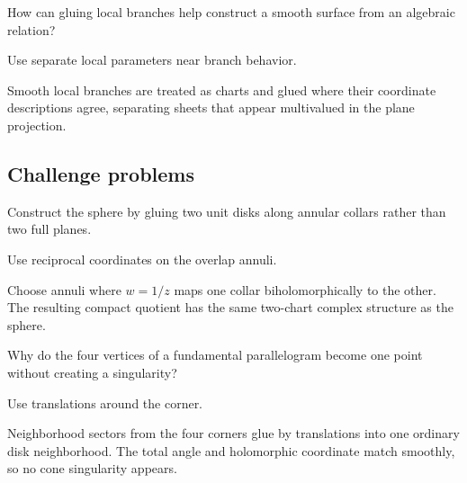 \begin{exercise}\label{exr:iv25-expand-14}
How can gluing local branches help construct a smooth surface from an algebraic relation?
\end{exercise}
\begin{hint}
Use separate local parameters near branch behavior.
\end{hint}
\begin{solution}
Smooth local branches are treated as charts and glued where their coordinate descriptions agree, separating sheets that appear multivalued in the plane projection.
\end{solution}

\subsection*{Challenge problems}

\begin{exercise}\label{exr:iv25-expand-15}
Construct the sphere by gluing two unit disks along annular collars rather than two full planes.
\end{exercise}
\begin{hint}
Use reciprocal coordinates on the overlap annuli.
\end{hint}
\begin{solution}
Choose annuli where \(w=1/z\) maps one collar biholomorphically to the other. The resulting compact quotient has the same two-chart complex structure as the sphere.
\end{solution}

\begin{exercise}\label{exr:iv25-expand-16}
Why do the four vertices of a fundamental parallelogram become one point without creating a singularity?
\end{exercise}
\begin{hint}
Use translations around the corner.
\end{hint}
\begin{solution}
Neighborhood sectors from the four corners glue by translations into one ordinary disk neighborhood. The total angle and holomorphic coordinate match smoothly, so no cone singularity appears.
\end{solution}


